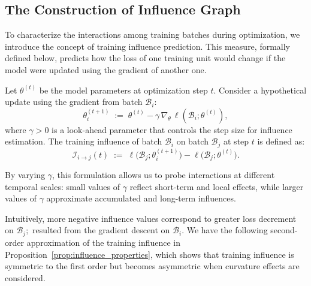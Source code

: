 \subsection{The Construction of Influence Graph}
\label{sec:dynamic-conditioning}
To characterize the interactions among training batches during optimization, we introduce the concept of training influence prediction. This measure, formally defined below, predicts how the loss of one training unit would change if the model were updated using the gradient of another one.
\begin{tcolorbox}[colback=lightpurple, colframe=lightpurple, sharp corners=all, boxrule=0mm, boxsep=0.5mm, left=1.5mm, right=1.5mm, top=1.5mm, bottom=1.5mm]
\begin{definition}
\label{def:training_influence}
Let $\theta^{(t)}$ be the model parameters at optimization step $t$. Consider a hypothetical update using the gradient from batch $\mathcal{B}_i$:
\[
\theta_i^{(t+1)} \;:=\; \theta^{(t)} - \gamma \, \nabla_{\!\theta}\, \ell(\mathcal{B}_i; \theta^{(t)}),
\]
where $\gamma > 0$ is a look-ahead parameter that controls the step size for influence estimation. 
The training influence of batch $\mathcal{B}_i$ on batch $\mathcal{B}_j$ at step $t$ is defined as:
\[
\mathcal{I}_{i \to j}(t) \;:=\; \ell\bigl(\mathcal{B}_j; \theta_i^{(t+1)}\bigr) - \ell\bigl(\mathcal{B}_j; \theta^{(t)}\bigr).
\]
\end{definition}
\end{tcolorbox}
By varying \(\gamma\), this formulation allows us to probe interactions at different temporal scales: small values of \(\gamma\) reflect short-term and local effects, while larger values of \(\gamma\) approximate accumulated and long-term influences.

Intuitively, more negative influence values correspond to greater loss decrement on $\mathcal{B}_j;$ resulted from the gradient descent on $\mathcal{B}_i$. 
We have the following second-order approximation of the training influence in Proposition~\ref{prop:influence_properties}, 
which shows that training influence is symmetric to the first order but becomes asymmetric when curvature effects are considered.





